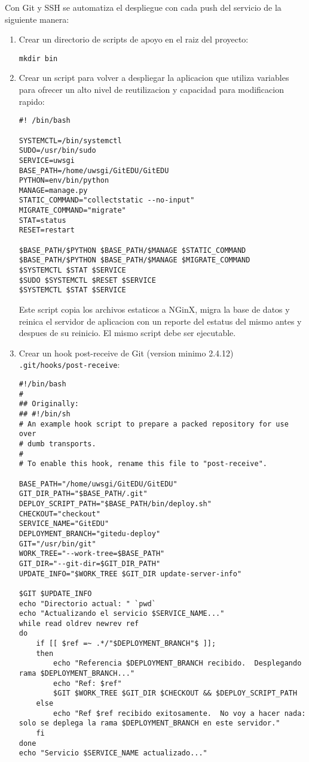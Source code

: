 Con Git y SSH se automatiza el despliegue con cada push del servicio de la siguiente manera:
\begin{enumerate}
	\item Crear un directorio de scripts de apoyo en el raiz del proyecto:
    \begin{lstlisting}
mkdir bin
    \end{lstlisting}
    \item Crear un script para volver a despliegar la aplicacion que utiliza variables para ofrecer un alto nivel de reutilizacion y capacidad para modificacion rapido:
    \begin{lstlisting}
#! /bin/bash

SYSTEMCTL=/bin/systemctl
SUDO=/usr/bin/sudo
SERVICE=uwsgi
BASE_PATH=/home/uwsgi/GitEDU/GitEDU
PYTHON=env/bin/python
MANAGE=manage.py
STATIC_COMMAND="collectstatic --no-input"
MIGRATE_COMMAND="migrate"
STAT=status
RESET=restart

$BASE_PATH/$PYTHON $BASE_PATH/$MANAGE $STATIC_COMMAND
$BASE_PATH/$PYTHON $BASE_PATH/$MANAGE $MIGRATE_COMMAND
$SYSTEMCTL $STAT $SERVICE
$SUDO $SYSTEMCTL $RESET $SERVICE
$SYSTEMCTL $STAT $SERVICE
    \end{lstlisting}
    Este script copia los archivos estaticos a NGinX, migra la base de datos y reinica el servidor de aplicacion con un reporte del estatus del mismo antes y despues de su reinicio. El mismo script debe ser ejecutable.
    \item Crear un hook post-receive de Git (version minimo 2.4.12) \\
    \texttt{.git/hooks/post-receive}:
    \begin{lstlisting}[breaklines=true]
#!/bin/bash
#
## Originally:
## #!/bin/sh
# An example hook script to prepare a packed repository for use over
# dumb transports.
#
# To enable this hook, rename this file to "post-receive".

BASE_PATH="/home/uwsgi/GitEDU/GitEDU"
GIT_DIR_PATH="$BASE_PATH/.git"
DEPLOY_SCRIPT_PATH="$BASE_PATH/bin/deploy.sh"
CHECKOUT="checkout"
SERVICE_NAME="GitEDU"
DEPLOYMENT_BRANCH="gitedu-deploy"
GIT="/usr/bin/git"
WORK_TREE="--work-tree=$BASE_PATH"
GIT_DIR="--git-dir=$GIT_DIR_PATH"
UPDATE_INFO="$WORK_TREE $GIT_DIR update-server-info"

$GIT $UPDATE_INFO
echo "Directorio actual: " `pwd`
echo "Actualizando el servicio $SERVICE_NAME..."
while read oldrev newrev ref
do
    if [[ $ref =~ .*/"$DEPLOYMENT_BRANCH"$ ]];
    then
        echo "Referencia $DEPLOYMENT_BRANCH recibido.  Desplegando rama $DEPLOYMENT_BRANCH..."
        echo "Ref: $ref"
        $GIT $WORK_TREE $GIT_DIR $CHECKOUT && $DEPLOY_SCRIPT_PATH
    else
        echo "Ref $ref recibido exitosamente.  No voy a hacer nada: solo se deplega la rama $DEPLOYMENT_BRANCH en este servidor."
    fi
done
echo "Servicio $SERVICE_NAME actualizado..."


\end{lstlisting}
\end{enumerate}
